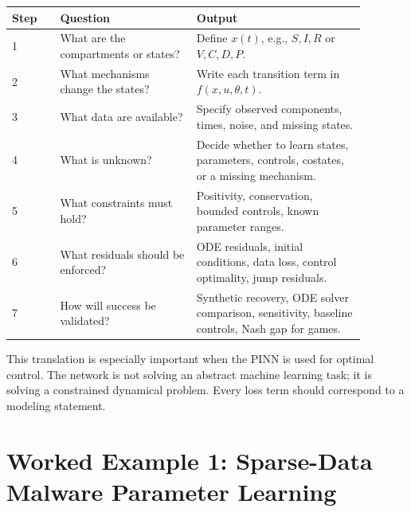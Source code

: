 \documentclass[11pt,a4paper]{article}
\begin{document}
\begin{longtable}{p{0.12\linewidth}p{0.34\linewidth}p{0.42\linewidth}}
\toprule
Step & Question & Output \\
\midrule
1 & What are the compartments or states? & Define $x(t)$, e.g., $S,I,R$ or $V,C,D,P$. \\
2 & What mechanisms change the states? & Write each transition term in $f(x,u,\theta,t)$. \\
3 & What data are available? & Specify observed components, times, noise, and missing states. \\
4 & What is unknown? & Decide whether to learn states, parameters, controls, costates, or a missing mechanism. \\
5 & What constraints must hold? & Positivity, conservation, bounded controls, known parameter ranges. \\
6 & What residuals should be enforced? & ODE residuals, initial conditions, data loss, control optimality, jump residuals. \\
7 & How will success be validated? & Synthetic recovery, ODE solver comparison, sensitivity, baseline controls, Nash gap for games. \\
\bottomrule
\end{longtable}

\begin{center}
\end{center}

This translation is especially important when the PINN is used for optimal control. The network is not solving an abstract machine learning task; it is solving a constrained dynamical problem. Every loss term should correspond to a modeling statement.

\section{Worked Example 1: Sparse-Data Malware Parameter Learning}
\end{document}
